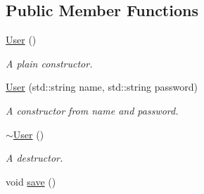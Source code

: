 \subsection*{Public Member Functions}
\begin{DoxyCompactItemize}
\item 
\hypertarget{class_r_c_f_1_1_server_1_1_user_ae9aafa1ba796f51cc4a2e30a9dd898d6}{}\hyperlink{class_r_c_f_1_1_server_1_1_user_ae9aafa1ba796f51cc4a2e30a9dd898d6}{User} ()\label{class_r_c_f_1_1_server_1_1_user_ae9aafa1ba796f51cc4a2e30a9dd898d6}

\begin{DoxyCompactList}\small\item\em A plain constructor. \end{DoxyCompactList}\item 
\hyperlink{class_r_c_f_1_1_server_1_1_user_a4aa87a8b0db79394463e8c42f5de3ae2}{User} (std\+::string name, std\+::string password)
\begin{DoxyCompactList}\small\item\em A constructor from name and password. \end{DoxyCompactList}\item 
\hypertarget{class_r_c_f_1_1_server_1_1_user_afb31dd6c504b06109ace809caf170856}{}\hyperlink{class_r_c_f_1_1_server_1_1_user_afb31dd6c504b06109ace809caf170856}{$\sim$\+User} ()\label{class_r_c_f_1_1_server_1_1_user_afb31dd6c504b06109ace809caf170856}

\begin{DoxyCompactList}\small\item\em A destructor. \end{DoxyCompactList}\item 
\hypertarget{class_r_c_f_1_1_server_1_1_user_ac8fc8fb8562ba7a1d45fa723372f3eb4}{}void \hyperlink{class_r_c_f_1_1_server_1_1_user_ac8fc8fb8562ba7a1d45fa723372f3eb4}{save} ()\label{class_r_c_f_1_1_server_1_1_user_ac8fc8fb8562ba7a1d45fa723372f3eb4}


\end{DoxyCompactItemize}

